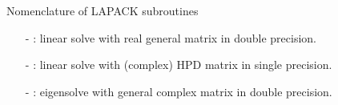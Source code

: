 \documentclass[t,usepdftitle=false]{beamer}
\begin{document}
\begin{frame}{Nomenclature of LAPACK subroutines}
\begin{itemize}
\begin{itemize}\normalsize
\item[-] 
{}{}{}: 
linear solve with real general matrix in double precision.\vspace{.05cm}
\item[-] 
{}{}{}: 
linear solve with (complex) HPD matrix in single precision.\vspace{.05cm}
\item[-] 
{}{}{}: 
eigensolve with general complex matrix in double precision.
\end{itemize}
\end{itemize}
\end{frame}
\end{document}
